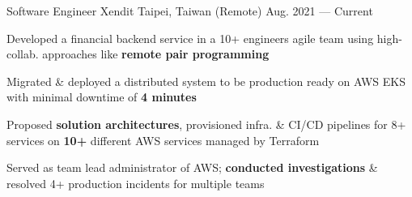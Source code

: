 

\begin{cventries}

\cventry
{Software Engineer } %
{Xendit} %
{Taipei, Taiwan (Remote)} %
{Aug. 2021 --- Current} %
{
  \begin{cvitems} %
    \item {Developed a financial backend service in a 10+ engineers agile team using high-collab. approaches like \textbf{remote pair programming}}
    \item {Migrated \& deployed a distributed system to be production ready on AWS EKS with minimal downtime of \textbf{4 minutes}}
    \item {Proposed \textbf{solution architectures}, provisioned infra. \& CI/CD pipelines for 8+ services on \textbf{10+} different AWS services managed by Terraform}
    \item {Served as team lead administrator of AWS; \textbf{conducted investigations} \& resolved 4+ production incidents for multiple teams}
  \end{cvitems}
}


\end{cventries}
